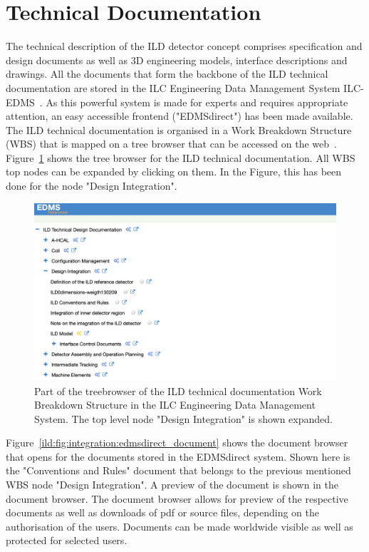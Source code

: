 \section{Technical Documentation}

The technical description of the ILD detector concept comprises specification and design documents as well as 3D engineering models, interface descriptions and drawings. All the documents that form the backbone of the ILD technical documentation are stored in the ILC Engineering Data Management System ILC-EDMS~\cite{ild:bib:edms}. As this powerful system is made for experts and requires appropriate attention, an easy accessible frontend ("EDMSdirect") has been made available. The ILD technical documentation is organised in a Work Breakdown Structure (WBS) that is mapped on a tree browser that can be accessed on the web~\cite{ild:bib:edmsdirect}. Figure~\ref{ild:fig:integration:edmsdirect} shows the tree browser for the ILD technical documentation. All WBS top nodes can be expanded by clicking on them. In the Figure, this has been done for the node "Design Integration".


\begin{figure}[t!]
\centering
\includegraphics[width=0.8\hsize]{Integration/fig/EDMS_direct.png}

\caption{\label{ild:fig:integration:edmsdirect}Part of the treebrowser of the ILD technical documentation Work Breakdown Structure in the ILC Engineering Data Management System. The top level node "Design Integration" is shown expanded.}
\end{figure}

Figure~\ref{ild:fig:integration:edmsdirect_document} shows the document browser that opens for the documents stored in the EDMSdirect system. Shown here is the "Conventions and Rules" document that belongs to the previous mentioned WBS node "Design Integration". A preview of the document is shown in the document browser. The document browser allows for preview of the respective documents as well as downloads of pdf or source files, depending on the authorisation of the users. Documents can be made worldwide visible as well as protected for selected users.

